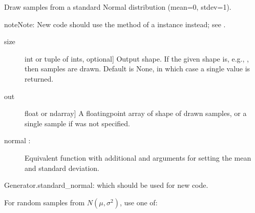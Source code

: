 \documentclass[letterpaper,10pt,english]{sphinxmanual}
\begin{document}

\begin{fulllineitems}
\label{\detokenize{infrapy.utils:infrapy.utils.ref2sac.standard_normal}}
Draw samples from a standard Normal distribution (mean=0, stdev=1).

\begin{sphinxadmonition}{note}{Note:}
New code should use the  method of a 
instance instead; see .
\end{sphinxadmonition}
\begin{description}
\item[{size}] \leavevmode{[}int or tuple of ints, optional{]}
Output shape.  If the given shape is, e.g., , then
 samples are drawn.  Default is None, in which case a
single value is returned.

\end{description}
\begin{description}
\item[{out}] \leavevmode{[}float or ndarray{]}
A floating\sphinxhyphen{}point array of shape  of drawn samples, or a
single sample if  was not specified.

\end{description}
\begin{description}
\item[{normal :}] \leavevmode
Equivalent function with additional  and  arguments
for setting the mean and standard deviation.

\end{description}

Generator.standard\_normal: which should be used for new code.

For random samples from \(N(\mu, \sigma^2)\), use one of:

\begin{sphinxVerbatim}[commandchars=\\\{\}]
    
  
\end{sphinxVerbatim}


\end{fulllineitems}
\end{document}

